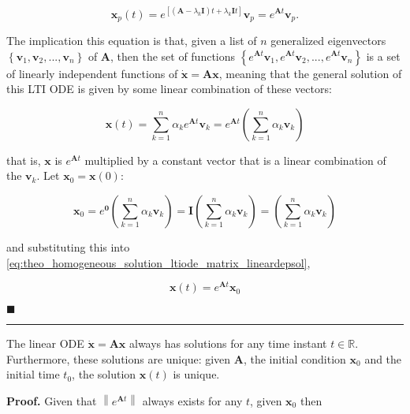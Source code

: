 \begin{equation} \mathbf{x}_p(t) = e^{\left[\left(\mathbf{A}-\lambda_k\mathbf{I}\right)t + \lambda_k \mathbf{I} t\right]}\mathbf{v}_p = e^{\mathbf{A}t}\mathbf{v}_p . \end{equation}

	The implication this equation is that, given a list of $n$ generalized eigenvectors $\left\{\mathbf{v}_1,\mathbf{v}_2,...,\mathbf{v}_n\right\}$ of $\mathbf{A}$, then the set of functions $\left\{e^{\mathbf{A}t}\mathbf{v}_1,e^{\mathbf{A}t}\mathbf{v}_2,...,e^{\mathbf{A}t}\mathbf{v}_n\right\}$ is a set of linearly independent functions of $\dot{\mathbf{x}} = \mathbf{Ax}$, meaning that the general solution of this LTI ODE is given by some linear combination of these vectors:

\begin{equation} \mathbf{x}(t) = \sum\limits_{k=1}^n \alpha_k e^{\mathbf{A}t}\mathbf{v}_k = e^{\mathbf{A}t}\left(\sum\limits_{k=1}^n \alpha_k \mathbf{v}_k\right) \label{eq:theo_homogeneous_solution_ltiode_matrix_lineardepsol} \end{equation}

	that is, $\mathbf{x}$ is $e^{\mathbf{A}t}$ multiplied by a constant vector that is a linear combination of the $\mathbf{v}_k$. Let $\mathbf{x}_0 = \mathbf{x}(0)$:

\begin{equation} \mathbf{x}_0 = e^{\mathbf{0}}\left(\sum\limits_{k=1}^n \alpha_k \mathbf{v}_k\right) = \mathbf{I}\left(\sum\limits_{k=1}^n \alpha_k \mathbf{v}_k\right) = \left(\sum\limits_{k=1}^n \alpha_k \mathbf{v}_k\right) \end{equation}

	and substituting this into \eqref{eq:theo_homogeneous_solution_ltiode_matrix_lineardepsol},

\begin{equation} \mathbf{x}(t) = e^{\mathbf{A}t}\mathbf{x}_0 \end{equation}

\hfill$\blacksquare$
\vspace{5mm}
\hrule
\vspace{5mm}

\begin{corollary}\label{theo:existence_uniqueness} %
	The linear ODE $\dot{\mathbf{x}} = \mathbf{Ax}$ always has solutions for any time instant $t\in\mathbb{R}$. Furthermore, these solutions are unique: given $\mathbf{A}$, the initial condition $\mathbf{x}_0$ and the initial time $t_0$, the solution $\mathbf{x}(t)$ is unique.
\end{corollary}
\noindent\textbf{Proof.} Given that $\left\lVert e^{\mathbf{A}t}\right\rVert$ always exists for any $t$, given $\mathbf{x}_0$ then

